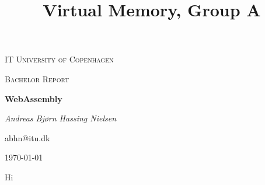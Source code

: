 \documentclass[a4paper]{article}
\title{Virtual Memory, Group A}
\begin{document}
\begin{titlepage}
	\centering
	{\scshape\LARGE IT University of Copenhagen \par}
	\vspace{1cm}
	{\scshape\Large Bachelor Report\par}
	\vspace{1.5cm}
	{\huge\bfseries WebAssembly \par}
	\vspace{2cm}
	{\Large\itshape Andreas Bjørn Hassing Nielsen\par}
	abhn@itu.dk\\
	\vfill
	{\large \today\par}
\end{titlepage}
\tableofcontents
\newpage
\onehalfspacing

Hi
\end{document}
